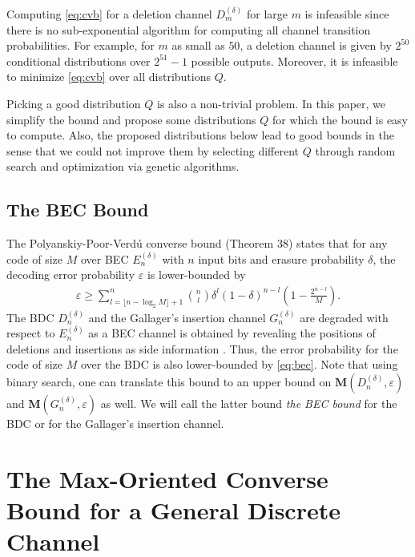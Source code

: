 \documentclass[journal, twocol]{IEEEtran}
\newcommand{\bfM}{{\mathbf{M}}}
\newcommand{\br}[1]{{\left({#1}\right)}}
\newcommand{\floor}[1]{\lfloor{{#1}\rfloor}}
\newcommand{\ve}{\varepsilon}
\begin{document}
Computing \eqref{eq:cvb} for a deletion channel $D_m^{(\delta)}$ for large $m$ is infeasible since there is no sub-exponential algorithm for computing all channel transition probabilities.
For example, for $m$ as small as $50$, a deletion channel is given by $2^{50}$ conditional distributions over $2^{51}-1$ possible outputs.
Moreover, it is infeasible to minimize \eqref{eq:cvb} over all distributions $Q$.

Picking a good distribution $Q$ is also a non-trivial problem. In this paper, we simplify the bound and propose some distributions $Q$ for which the bound is easy to compute.
Also, the proposed distributions below lead to good bounds in the sense that we could not improve them by selecting different $Q$ through random search and optimization via genetic algorithms.

\subsection{The BEC Bound}

The Polyanskiy-Poor-Verd\'u converse bound \cite{polyanskiy2010channel} (Theorem 38) states that for any code of size $M$ over BEC $E_n^{(\delta)}$ with $n$ input bits and erasure probability $\delta$, the decoding error probability $\ve$ is lower-bounded by
\begin{align}
\ve\geq \sum_{l=\floor{n-\log_2 M}+1}^n \binom{n}{l} \delta^l (1-\delta)^{n-l} \br{1-\frac{2^{n-l}}{M}}.
\label{eq:bec}
\end{align}
The BDC $D^{(\delta)}_n$ and the Gallager's insertion channel $G_n^{(\delta)}$ are degraded with respect to $E_n^{(\delta)}$ as a BEC channel is obtained by revealing the positions of deletions and insertions as side information \cite{fertonani10novel, fertonani11upper}. Thus, the error probability for the code of size $M$ over the BDC is also lower-bounded by \eqref{eq:bec}.
Note that using binary search, one can translate this bound to an upper bound on $\bfM(D^{(\delta)}_n,\ve)$ and $\bfM(G^{(\delta)}_n,\ve)$ as well.
We will call the latter bound \emph{the BEC bound} for the BDC or for the Gallager's insertion channel.


\section{The Max-Oriented Converse Bound for a General Discrete Channel}
\label{s:mocvb}
\end{document}
